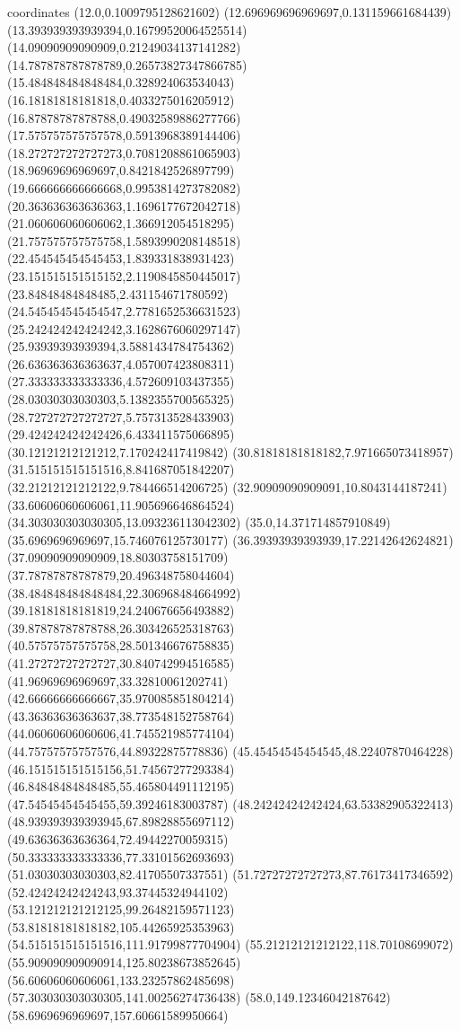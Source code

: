 coordinates {%
(12.0,0.1009795128621602)
(12.696969696969697,0.131159661684439)
(13.393939393939394,0.16799520064525514)
(14.09090909090909,0.21249034137141282)
(14.787878787878789,0.26573827347866785)
(15.484848484848484,0.328924063534043)
(16.18181818181818,0.4033275016205912)
(16.87878787878788,0.49032589886277766)
(17.575757575757578,0.5913968389144406)
(18.272727272727273,0.7081208861065903)
(18.96969696969697,0.8421842526897799)
(19.666666666666668,0.9953814273782082)
(20.363636363636363,1.1696177672042718)
(21.060606060606062,1.366912054518295)
(21.757575757575758,1.5893990208148518)
(22.454545454545453,1.839331838931423)
(23.151515151515152,2.1190845850445017)
(23.84848484848485,2.431154671780592)
(24.545454545454547,2.7781652536631523)
(25.242424242424242,3.1628676060297147)
(25.93939393939394,3.5881434784754362)
(26.636363636363637,4.057007423808311)
(27.333333333333336,4.572609103437355)
(28.03030303030303,5.1382355700565325)
(28.727272727272727,5.757313528433903)
(29.424242424242426,6.433411575066895)
(30.12121212121212,7.170242417419842)
(30.81818181818182,7.971665073418957)
(31.515151515151516,8.841687051842207)
(32.21212121212122,9.784466514206725)
(32.90909090909091,10.8043144187241)
(33.60606060606061,11.905696646864524)
(34.303030303030305,13.093236113042302)
(35.0,14.371714857910849)
(35.6969696969697,15.746076125730177)
(36.39393939393939,17.22142642624821)
(37.09090909090909,18.80303758151709)
(37.78787878787879,20.496348758044604)
(38.484848484848484,22.306968484664992)
(39.18181818181819,24.240676656493882)
(39.87878787878788,26.303426525318763)
(40.57575757575758,28.501346676758835)
(41.27272727272727,30.840742994516585)
(41.96969696969697,33.32810061202741)
(42.66666666666667,35.970085851804214)
(43.36363636363637,38.773548152758764)
(44.06060606060606,41.745521985774104)
(44.75757575757576,44.89322875778836)
(45.45454545454545,48.22407870464228)
(46.151515151515156,51.74567277293384)
(46.84848484848485,55.465804491112195)
(47.54545454545455,59.39246183003787)
(48.24242424242424,63.53382905322413)
(48.939393939393945,67.89828855697112)
(49.63636363636364,72.49442270059315)
(50.333333333333336,77.33101562693693)
(51.03030303030303,82.41705507337551)
(51.72727272727273,87.76173417346592)
(52.42424242424243,93.37445324944102)
(53.121212121212125,99.26482159571123)
(53.81818181818182,105.44265925353963)
(54.515151515151516,111.91799877704904)
(55.21212121212122,118.70108699072)
(55.909090909090914,125.80238673852645)
(56.60606060606061,133.23257862485698)
(57.303030303030305,141.00256274736438)
(58.0,149.12346042187642)
(58.6969696969697,157.60661589950664)
}
